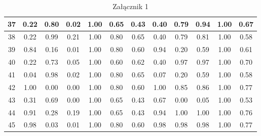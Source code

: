\documentclass{article}
\begin{document}
\begin{table}[h!]
\begin{tabular}{|c|c|c|c|c|c|c|c|c|c|c|c|}
    \hline
    37 & 0.22 & 0.80 & 0.02 & 1.00 & 0.65 & 0.43 & 0.40 & 0.79 & 0.94 & 1.00 & 0.67 \\
    \hline
    38 & 0.22 & 0.99 & 0.21 & 1.00 & 0.80 & 0.65 & 0.40 & 0.79 & 0.81 & 1.00 & 0.58 \\
    \hline
    39 & 0.84 & 0.16 & 0.01 & 1.00 & 0.80 & 0.60 & 0.94 & 0.20 & 0.59 & 1.00 & 0.61 \\
    \hline
    40 & 0.22 & 0.73 & 0.05 & 1.00 & 0.60 & 0.62 & 0.40 & 0.97 & 0.97 & 1.00 & 0.70 \\
    \hline
    41 & 0.04 & 0.98 & 0.02 & 1.00 & 0.80 & 0.65 & 0.07 & 0.20 & 0.59 & 1.00 & 0.58 \\
    \hline
    42 & 1.00 & 0.00 & 0.00 & 1.00 & 0.80 & 0.60 & 1.00 & 0.85 & 0.86 & 1.00 & 0.77 \\
    \hline
    43 & 0.31 & 0.69 & 0.00 & 1.00 & 0.65 & 0.43 & 0.67 & 0.00 & 0.05 & 1.00 & 0.53 \\
    \hline
    44 & 0.91 & 0.28 & 0.19 & 1.00 & 0.65 & 0.43 & 0.94 & 1.00 & 1.00 & 1.00 & 0.76 \\
    \hline
    45 & 0.98 & 0.03 & 0.01 & 1.00 & 0.80 & 0.60 & 0.98 & 0.98 & 0.98 & 1.00 & 0.77 \\
    \hline
    \end{tabular}
    \caption{Załącznik 1}
    \end{table}
\end{document}

